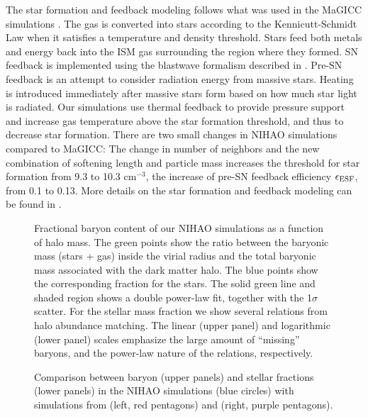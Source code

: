 \documentclass[useAMS,usenatbib]{mn2e}
\begin{document}
The star formation and feedback modeling follows what was used in the
MaGICC simulations \citep{Stinson13}.   The gas is converted into
  stars according to the Kennicutt-Schmidt Law when it satisfies a
  temperature and density threshold. Stars feed both metals and energy
  back into the ISM gas surrounding the region where they formed. SN
  feedback is implemented using the blastwave formalism described in
  \citet{Stinson06}. Pre-SN feedback is an attempt to consider
  radiation energy from massive stars. Heating is introduced
  immediately after massive stars form based on how much star light is
  radiated.  Our simulations use thermal feedback to provide pressure
  support and  increase gas temperature above the star formation
  threshold, and thus to decrease star formation.  There are two
small changes in NIHAO simulations compared to MaGICC:
The change in  number of neighbors
and the new combination of softening length and  particle mass
increases the threshold for star formation from  9.3 to 10.3
cm$^{-3}$, the increase of pre-SN feedback efficiency $\epsilon_{\rm
  ESF}$, from 0.1 to 0.13.  More details on the star formation and
feedback modeling can be found in \citet{Wang15}.


\begin{figure}
\centerline{
}
\caption{Fractional baryon content of our NIHAO simulations  as a
  function of halo mass. The green points show the ratio between the
  baryonic mass (stars + gas) inside the virial radius and the total
  baryonic mass associated with the dark matter halo. The blue points
  show the corresponding fraction for the stars. The solid green line
  and shaded region shows a double power-law fit, together with the
  1$\sigma$ scatter. For the stellar mass fraction we show several
  relations from halo abundance matching.    The linear (upper panel)
  and logarithmic (lower panel) scales emphasize the large amount of
  ``missing'' baryons, and the power-law nature of the relations,
  respectively.}
\label{fig:budget}
\end{figure}

\begin{figure*}
\centerline{
}
\caption{Comparison between baryon (upper panels) and stellar
    fractions (lower panels) in the NIHAO simulations (blue circles)
    with simulations from \citet{Voort16} (left, red pentagons) and
    \citet{Christensen16} (right, purple pentagons).}
\label{fig:fire_com}
\end{figure*}
\end{document}
